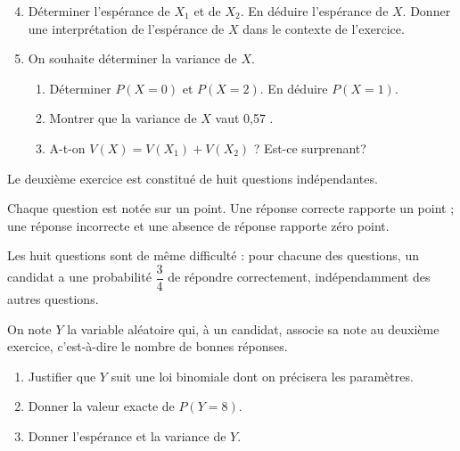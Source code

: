 \documentclass[10pt]{article}
\begin{document}
\begin{enumerate}
\setcounter{enumi}{3}
\item Déterminer l'espérance de $X_{1}$ et de $X_{2}$. En déduire l'espérance de $X$. Donner une interprétation de l'espérance de $X$ dans le contexte de l'exercice.

\item On souhaite déterminer la variance de $X$.

	\begin{enumerate}
		\item Déterminer $P(X = 0)$ et $P(X = 2)$. En déduire $P(X = 1)$.

		\item Montrer que la variance de $X$ vaut 0,57 .

		\item A-t-on $V(X) = V\left(X_{1}\right) + V\left(X_{2}\right)$ ? Est-ce surprenant?
	\end{enumerate}
\end{enumerate}


\medskip


\medskip

Le deuxième exercice est constitué de huit questions indépendantes.

Chaque question est notée sur un point. Une réponse correcte rapporte un point ; une réponse incorrecte et une absence de réponse rapporte zéro point.

Les huit questions sont de même difficulté : pour chacune des questions, un candidat a une probabilité $\dfrac{3}{4}$ de répondre correctement, indépendamment des autres questions.

On note $Y$ la variable aléatoire qui, à un candidat, associe sa note au deuxième exercice, c'est-à-dire le nombre de bonnes réponses.

\begin{enumerate}
\item Justifier que $Y$ suit une loi binomiale dont on précisera les paramètres.

\item Donner la valeur exacte de $P(Y = 8)$.

\item Donner l'espérance et la variance de $Y$.

\end{enumerate}


\medskip

\end{document}
